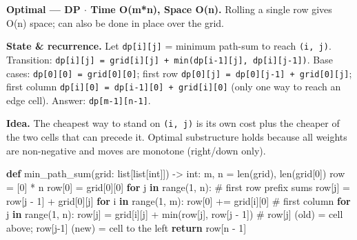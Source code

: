 \documentclass[11pt]{article}
\newenvironment{Shaded}{\begin{snugshade}}{\end{snugshade}}
\newcommand{\BuiltInTok}[1]{\textcolor[rgb]{0.50,0.55,0.55}{#1}}
\newcommand{\CommentTok}[1]{\textcolor[rgb]{0.48,0.49,0.49}{#1}}
\newcommand{\ControlFlowTok}[1]{\textcolor[rgb]{0.99,0.74,0.29}{\textbf{#1}}}
\newcommand{\DecValTok}[1]{\textcolor[rgb]{0.96,0.45,0.00}{#1}}
\newcommand{\KeywordTok}[1]{\textcolor[rgb]{0.81,0.81,0.76}{\textbf{#1}}}
\newcommand{\NormalTok}[1]{\textcolor[rgb]{0.81,0.81,0.76}{#1}}
\newcommand{\OperatorTok}[1]{\textcolor[rgb]{0.81,0.81,0.76}{#1}}
\begin{document}
\textbf{Optimal --- DP \(\cdot\) Time O(m*n), Space O(n).} Rolling a single row gives O(n) space; can also be done in place over the grid.

\textbf{State \& recurrence.} Let \texttt{dp{[}i{]}{[}j{]}} = minimum path-sum to reach \texttt{(i,\ j)}. Transition: \texttt{dp{[}i{]}{[}j{]}\ =\ grid{[}i{]}{[}j{]}\ +\ min(dp{[}i-1{]}{[}j{]},\ dp{[}i{]}{[}j-1{]})}. Base cases: \texttt{dp{[}0{]}{[}0{]}\ =\ grid{[}0{]}{[}0{]}}; first row \texttt{dp{[}0{]}{[}j{]}\ =\ dp{[}0{]}{[}j-1{]}\ +\ grid{[}0{]}{[}j{]}}; first column \texttt{dp{[}i{]}{[}0{]}\ =\ dp{[}i-1{]}{[}0{]}\ +\ grid{[}i{]}{[}0{]}} (only one way to reach an edge cell). Answer: \texttt{dp{[}m-1{]}{[}n-1{]}}.

\textbf{Idea.} The cheapest way to stand on \texttt{(i,\ j)} is its own cost plus the cheaper of the two cells that can precede it. Optimal substructure holds because all weights are non-negative and moves are monotone (right/down only).


\begin{Shaded}
\begin{Highlighting}[]
\KeywordTok{def}\NormalTok{ min\_path\_sum(grid: }\BuiltInTok{list}\NormalTok{[}\BuiltInTok{list}\NormalTok{[}\BuiltInTok{int}\NormalTok{]]) }\OperatorTok{{-}\textgreater{}} \BuiltInTok{int}\NormalTok{:}
\NormalTok{    m, n }\OperatorTok{=} \BuiltInTok{len}\NormalTok{(grid), }\BuiltInTok{len}\NormalTok{(grid[}\DecValTok{0}\NormalTok{])}
\NormalTok{    row }\OperatorTok{=}\NormalTok{ [}\DecValTok{0}\NormalTok{] }\OperatorTok{*}\NormalTok{ n}
\NormalTok{    row[}\DecValTok{0}\NormalTok{] }\OperatorTok{=}\NormalTok{ grid[}\DecValTok{0}\NormalTok{][}\DecValTok{0}\NormalTok{]}
    \ControlFlowTok{for}\NormalTok{ j }\KeywordTok{in} \BuiltInTok{range}\NormalTok{(}\DecValTok{1}\NormalTok{, n):              }\CommentTok{\# first row prefix sums}
\NormalTok{        row[j] }\OperatorTok{=}\NormalTok{ row[j }\OperatorTok{{-}} \DecValTok{1}\NormalTok{] }\OperatorTok{+}\NormalTok{ grid[}\DecValTok{0}\NormalTok{][j]}
    \ControlFlowTok{for}\NormalTok{ i }\KeywordTok{in} \BuiltInTok{range}\NormalTok{(}\DecValTok{1}\NormalTok{, m):}
\NormalTok{        row[}\DecValTok{0}\NormalTok{] }\OperatorTok{+=}\NormalTok{ grid[i][}\DecValTok{0}\NormalTok{]           }\CommentTok{\# first column}
        \ControlFlowTok{for}\NormalTok{ j }\KeywordTok{in} \BuiltInTok{range}\NormalTok{(}\DecValTok{1}\NormalTok{, n):}
\NormalTok{            row[j] }\OperatorTok{=}\NormalTok{ grid[i][j] }\OperatorTok{+} \BuiltInTok{min}\NormalTok{(row[j], row[j }\OperatorTok{{-}} \DecValTok{1}\NormalTok{])}
        \CommentTok{\# row[j] (old) = cell above; row[j{-}1] (new) = cell to the left}
    \ControlFlowTok{return}\NormalTok{ row[n }\OperatorTok{{-}} \DecValTok{1}\NormalTok{]}
\end{Highlighting}
\end{Shaded}
\end{document}
